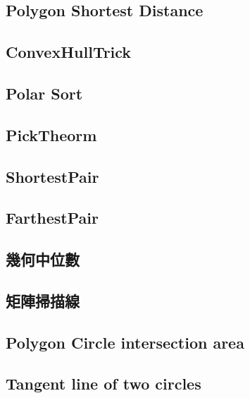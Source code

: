 \subsection{Polygon Shortest Distance}


\subsection{ConvexHullTrick}


\subsection{Polar Sort}


\subsection{PickTheorm}


\subsection{ShortestPair}


\subsection{FarthestPair}


\subsection{幾何中位數}


\subsection{矩陣掃描線}


\subsection{Polygon Circle intersection area}


\subsection{Tangent line of two circles}


